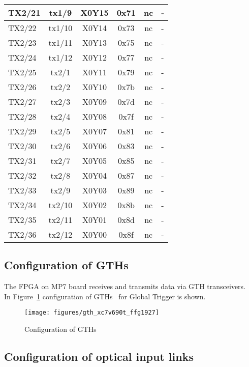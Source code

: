 \begin{longtable}{|l|c|c|c|c|l|}
TX2/21 & tx1/9  & X0Y15 & 0x71 & nc & -\\\hline
TX2/22 & tx1/10 & X0Y14 & 0x73 & nc & -\\\hline
TX2/23 & tx1/11 & X0Y13 & 0x75 & nc & -\\\hline
TX2/24 & tx1/12 & X0Y12 & 0x77 & nc & -\\\hline
TX2/25 & tx2/1  & X0Y11 & 0x79 & nc & -\\\hline
TX2/26 & tx2/2  & X0Y10 & 0x7b & nc & -\\\hline
TX2/27 & tx2/3  & X0Y09 & 0x7d & nc & -\\\hline
TX2/28 & tx2/4  & X0Y08 & 0x7f & nc & -\\\hline
TX2/29 & tx2/5  & X0Y07 & 0x81 & nc & -\\\hline
TX2/30 & tx2/6  & X0Y06 & 0x83 & nc & -\\\hline
TX2/31 & tx2/7  & X0Y05 & 0x85 & nc & -\\\hline
TX2/32 & tx2/8  & X0Y04 & 0x87 & nc & -\\\hline
TX2/33 & tx2/9  & X0Y03 & 0x89 & nc & -\\\hline
TX2/34 & tx2/10 & X0Y02 & 0x8b & nc & -\\\hline
TX2/35 & tx2/11 & X0Y01 & 0x8d & nc & -\\\hline
TX2/36 & tx2/12 & X0Y00 & 0x8f & nc & -\\\hline
\end{longtable}

\clearpage
\subsection{Configuration of GTHs}\label{sec:app:app_a}

The FPGA on MP7 board receives and transmits data via GTH transceivers.\\
In Figure~\ref{fig:app:gth_conf} configuration of GTHs~\cite{GTHs} for Global Trigger is shown.

\begin{figure}[htb]
\centering
\texttt{[image: figures/gth\_xc7v690t\_ffg1927]}
\caption{Configuration of GTHs}
\label{fig:app:gth_conf}
\end{figure}

\clearpage

\subsection{Configuration of optical input links}\label{sec:app:app_b}

